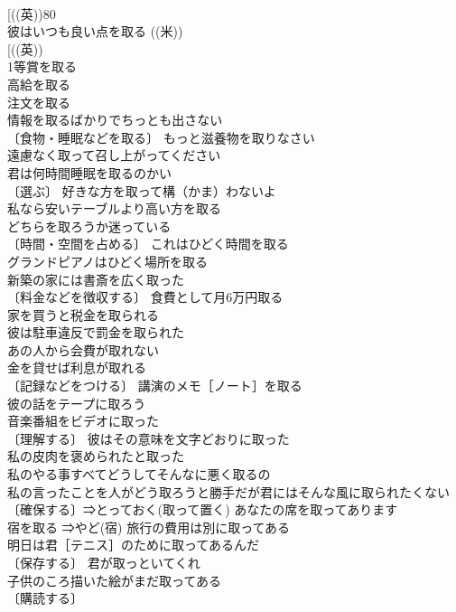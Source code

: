 \documentclass[8pt]{extreport}
\begin{document}
\begin{CJK}{UTF8}{min}
\\	[((英))80 
\\	彼はいつも良い点を取る ((米)) 
\\	[((英)) 
\\	1等賞を取る 
\\	高給を取る 
\\	注文を取る 
\\	情報を取るばかりでちっとも出さない 
\\	〔食物・睡眠などを取る〕 もっと滋養物を取りなさい 
\\	遠慮なく取って召し上がってください 
\\	君は何時間睡眠を取るのかい 
\\	〔選ぶ〕 好きな方を取って構（かま）わないよ 
\\	私なら安いテーブルより高い方を取る 
\\	どちらを取ろうか迷っている 
\\	〔時間・空間を占める〕 これはひどく時間を取る 
\\	グランドピアノはひどく場所を取る 
\\	新築の家には書斎を広く取った 
\\	〔料金などを徴収する〕 食費として月6万円取る 
\\	家を買うと税金を取られる 
\\	彼は駐車違反で罰金を取られた 
\\	あの人から会費が取れない 
\\	金を貸せば利息が取れる 
\\	〔記録などをつける〕 講演のメモ［ノート］を取る 
\\	彼の話をテープに取ろう 
\\	音楽番組をビデオに取った 
\\	〔理解する〕 彼はその意味を文字どおりに取った 
\\	私の皮肉を褒められたと取った 
\\	私のやる事すべてどうしてそんなに悪く取るの 
\\	私の言ったことを人がどう取ろうと勝手だが君にはそんな風に取られたくない 
\\	〔確保する〕⇒とっておく(取って置く) あなたの席を取ってあります 
\\	宿を取る ⇒やど(宿) 旅行の費用は別に取ってある 
\\	明日は君［テニス］のために取ってあるんだ 
\\	〔保存する〕 君が取っといてくれ 
\\	子供のころ描いた絵がまだ取ってある 
\\	〔購読する〕

\end{CJK}
\end{document}
